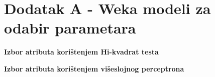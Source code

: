 \section*{Dodatak A - Weka modeli za odabir parametara}
\label{ch:addA}

\textbf{Izbor atributa korištenjem Hi-kvadrat testa}


\textbf{Izbor atributa korištenjem višeslojnog perceptrona}

